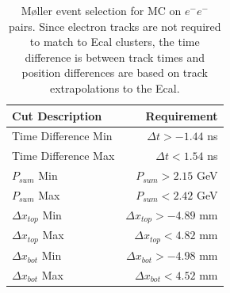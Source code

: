 \begin{table}[t] 
    \centering
    \begin{tabular}{lr}
        \toprule
        \textbf{Cut Description} & \textbf{Requirement} \\
        \midrule
        Time Difference Min & $\Delta t>-1.44$ ns\\
        Time Difference Max & $\Delta t<1.54$ ns\\
        $P_{sum}$ Min & $P_{sum}>2.15$ GeV\\
        $P_{sum}$ Max & $P_{sum}<2.42$ GeV\\
        $\Delta x_{top}$ Min & $\Delta x_{top}>-4.89$ mm\\
        $\Delta x_{top}$ Max & $\Delta x_{top}<4.82$ mm\\
        $\Delta x_{bot}$ Min & $\Delta x_{bot}>-4.98$ mm\\
        $\Delta x_{bot}$ Max & $\Delta x_{bot}<4.52$ mm\\
        \bottomrule
    \end{tabular}
    \caption{M\o ller event selection for MC on $e^-e^-$ pairs. Since electron tracks are not required to match to Ecal clusters, the time difference is between track times and position differences are based on track extrapolations to the Ecal.}
    \label{tab:moller_MC}
\end{table}


